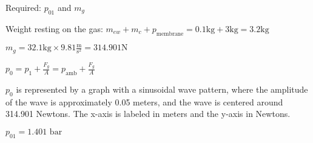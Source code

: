 Required: \( p_{01} \) and \( m_g \)

Weight resting on the gas: \( m_{ew} + m_c + p_{\text{membrane}} = 0.1 \text{kg} + 3 \text{kg} = 3.2 \text{kg} \)

\( m_g = 32.1 \text{kg} \times 9.81 \frac{\text{m}}{\text{s}^2} = 314.901 \text{N} \)

\( p_0 = p_1 + \frac{F_g}{A} = p_{\text{amb}} + \frac{F_g}{A} \)

\( p_0 \) is represented by a graph with a sinusoidal wave pattern, where the amplitude of the wave is approximately 0.05 meters, and the wave is centered around 314.901 Newtons. The x-axis is labeled in meters and the y-axis in Newtons.

\( p_{01} = 1.401 \text{ bar} \)